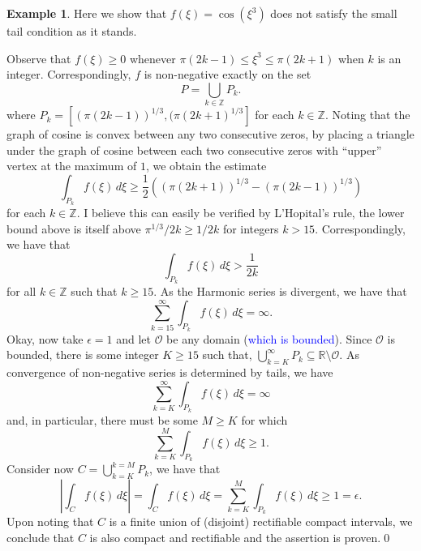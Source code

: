 \documentclass{article}
\theoremstyle{definition}
\newtheorem{exmp}{Example}[section]
\begin{document}
\begin{exmp}
Here we show that $f(\xi)=\cos(\xi^3)$ does not satisfy the small tail condition as it stands.

Observe that $f(\xi)\geq 0$ whenever $\pi(2k-1)\leq \xi^3\leq \pi(2k+1)$ when $k$ is an integer. Correspondingly, $f$ is non-negative exactly on the set
\begin{equation*}
P=\bigcup_{k\in\mathbb{Z}}P_k. 
\end{equation*}
where $P_k=[(\pi(2k-1))^{1/3},(\pi(2k+1)^{1/3}]$ for each $k\in\mathbb{Z}$.
Noting that the graph of cosine is convex between any two consecutive zeros, by placing a triangle under the graph of cosine between each two consecutive zeros with ``upper'' vertex at the maximum of $1$, we obtain the estimate
\begin{equation*}
\int_{P_k}f(\xi)\,d\xi\geq \frac{1}{2}\left((\pi(2k+1))^{1/3}-(\pi(2k-1))^{1/3}\right)
\end{equation*}
for each $k\in\mathbb{Z}$. I believe this can easily be verified by L'Hopital's rule, the lower bound above is itself above $\pi^{1/3}/2k\geq 1/2k $ for integers $k>15$. Correspondingly, we have that
\begin{equation*}
\int_{P_k}f(\xi)\,d\xi>\frac{1}{2k}
\end{equation*}
for all $k\in\mathbb{Z}$ such that $k\geq 15$. As the Harmonic series is divergent, we have that
\begin{equation*}
\sum_{k=15}^\infty \int_{P_k}f(\xi)\,d\xi=\infty.
\end{equation*}
Okay, now take $\epsilon=1$ and let $\mathcal{O}$ be any domain (\textcolor{blue}{which is bounded}). Since $\mathcal{O}$ is bounded, there is some integer $K\geq 15$ such that, $\bigcup_{k=K}^\infty P_k\subseteq \mathbb{R}\setminus\mathcal{O}$. As convergence of non-negative series is determined by tails, we have
\begin{equation*}
\sum_{k=K}^\infty \int_{P_k}f(\xi)\,d\xi=\infty
\end{equation*}
and, in particular, there must be some $M\geq K$ for which
\begin{equation*}
\sum_{k=K}^M\int_{P_k}f(\xi)\,d\xi\geq 1. 
\end{equation*}
Consider now $C=\bigcup_{k=K}^{k=M}P_k$, we have that
\begin{equation*}
\left|\int_C f(\xi)\,d\xi\right|=\int_Cf(\xi)\,d\xi=\sum_{k=K}^M\int_{P_k}f(\xi)\,d\xi\ge 1=\epsilon.
\end{equation*}
Upon noting that $C$ is a finite union of (disjoint) rectifiable compact intervals, we conclude that $C$ is also compact and rectifiable and the assertion is proven.\qed
\end{exmp}
\end{document}
